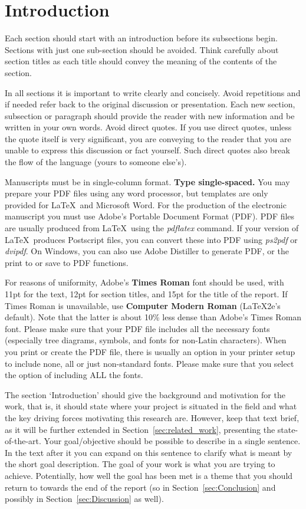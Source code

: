 \section{Introduction}
\label{sec:Introduction}

Each section should start with an introduction before its subsections begin.
Sections with just one sub-section should be avoided. 
Think carefully about section titles as each title should convey the meaning of the contents of the section. 

In all sections it is important to write clearly and concisely. 
Avoid repetitions and if needed refer back to the original discussion or presentation. 
Each new section, subsection or paragraph should provide the reader with new information and be written in your own words. 
Avoid direct quotes. If you use direct quotes, unless the quote itself is very significant, 
you are conveying to the reader that you are unable to express this discussion or fact yourself. 
Such direct quotes also break the flow of the language (yours to someone else's).   

Manuscripts must be in single-column format. {\bf Type single-spaced.}  
You may prepare your PDF files using any word processor, 
but templates are only provided for \LaTeX\ and Microsoft Word.
For the production of the electronic manuscript you must use Adobe's Portable Document Format (PDF). 
PDF files are usually produced from \LaTeX\ using the \textit{pdflatex} command. 
If your version of \LaTeX\ produces Postscript files, you can convert these into PDF using \textit{ps2pdf} or \textit{dvipdf}. 
On Windows, you can also use Adobe Distiller to generate PDF, or the print to  or save to PDF functions.

For reasons of uniformity, Adobe's {\bf Times Roman} font should be used, 
with 11pt for the text, 12pt for section titles, and 15pt for the title of the report.
If Times Roman is unavailable, use {\bf Computer Modern Roman} (\LaTeX2e{}'s default).  
Note that the latter is about 10\% less dense than Adobe's Times Roman font.
Please make sure that your PDF file includes all the necessary fonts (especially tree diagrams, symbols, and fonts for non-Latin characters). 
When you print or create the PDF file, there is usually an option in your printer setup to include none, all or just non-standard fonts.  
Please make sure that you select the option of including ALL the fonts.

The section `Introduction' should give the background and motivation for the work, that is, 
it should state where your project is situated in the field and what the key driving forces motivating this research are. 
However, keep that text brief, as it will be further extended in Section~\ref{sec:related_work}, presenting the state-of-the-art. 
Your goal/objective should be possible to describe in a single sentence. 
In the text after it you can expand on this sentence to clarify what is meant by the short goal description. 
The goal of your work is what you are trying to achieve. 
Potentially, how well the goal has been met is a theme that you should return to towards the end of the report (so in Section~\ref{sec:Conclusion} and possibly in Section~\ref{sec:Discussion} as well).

